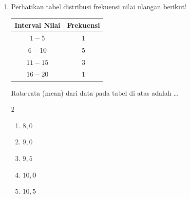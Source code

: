 \documentclass[12pt,a4paper]{article}
\begin{document}
\begin{enumerate}[itemsep=2ex]
    \item Perhatikan tabel distribusi frekuensi nilai ulangan berikut!\\
    \begin{center}
    \begin{tabular}{|c|c|}
    \hline
    \rowcolor{cyan!20}
    \textbf{Interval Nilai} & \textbf{Frekuensi} \\
    \hline
    $1 - 5$ & $1$ \\
    $6 - 10$ & $5$ \\
    $11 - 15$ & $3$ \\
    $16 - 20$ & $1$ \\
    \hline
    \end{tabular}
    \end{center}
    Rata-rata (mean) dari data pada tabel di atas adalah \dots
    \begin{multicols}{2}
    \begin{enumerate}[label=\Alph*.]
        \item $8,0$
        \item $9,0$
        \item $9,5$
        \item $10,0$
        \item $10,5$
    \end{enumerate}
    \end{multicols}


\end{enumerate}
\end{document}
